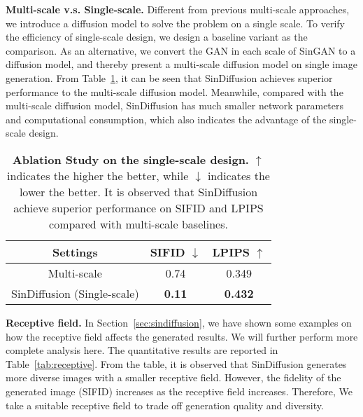 \documentclass[10pt,twocolumn,letterpaper]{article}
\begin{document}
\noindent \textbf{Multi-scale v.s. Single-scale.} 
Different from previous multi-scale approaches, we introduce a diffusion model to solve the problem on a single scale.
To verify the efficiency of single-scale design, we design a baseline variant as the comparison.
As an alternative, we convert the GAN in each scale of SinGAN to a diffusion model, and thereby present a multi-scale diffusion model on single image generation.
From Table~\ref{tab:multiscale}, it can be seen that SinDiffusion achieves superior performance to the multi-scale diffusion model.
Meanwhile, compared with the multi-scale diffusion model, SinDiffusion has much smaller network parameters and computational consumption, which also indicates the advantage of the single-scale design.

\begin{table}[t]
    \footnotesize
    \centering
    \begin{tabular}{c @{\hskip 14mm} c @{\hskip 14mm} c}
    \toprule
    \textbf{Settings} & \textbf{SIFID} $\downarrow$ & \textbf{LPIPS} $\uparrow$ \\
    \midrule
    {Multi-scale} & 0.74 & 0.349 \\
    {SinDiffusion (Single-scale)} & \textbf{0.11} & \textbf{0.432} \\
    \bottomrule
    \end{tabular}
    \vspace{-3mm}
    \caption{\textbf{Ablation Study on the single-scale design.}
    $\uparrow$ indicates the higher the better, while $\downarrow$ indicates the lower the better.
    It is observed that SinDiffusion achieve superior performance on SIFID and LPIPS compared with multi-scale baselines. 
    }
    \vspace{-3mm}
    \label{tab:multiscale}
\end{table}

\noindent \textbf{Receptive field.}
In Section~\ref{sec:sindiffusion}, we have shown some examples on how the receptive field affects the generated results.
We will further perform more complete analysis here.
The quantitative results are reported in Table~\ref{tab:receptive}.
From the table, it is observed that SinDiffusion generates more diverse images with a smaller receptive field.
However, the fidelity of the generated image (SIFID) increases as the receptive field increases.
Therefore, We take a suitable receptive field to trade off generation quality and diversity.
\end{document}
